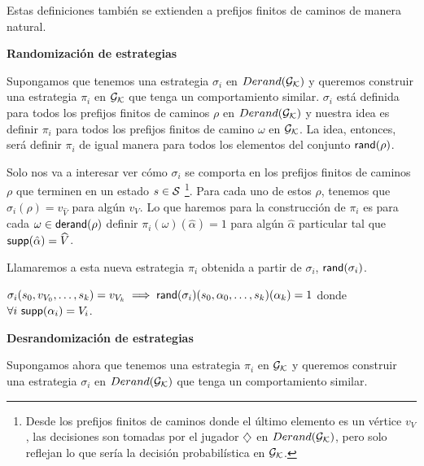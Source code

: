 Estas definiciones también se extienden a prefijos finitos de caminos de manera
natural.

\textbf{Randomización de estrategias}

Supongamos que tenemos una estrategia $\sigma_i$ en $Derand(\mathcal{G}_{\mathcal{K}})$ y queremos construir
una estrategia $\pi_i$ en $\mathcal{G}_{\mathcal{K}}$ que tenga un comportamiento similar. $\sigma_i$
está definida para todos los prefijos finitos de caminos $\rho$ en $Derand(\mathcal{G}_{\mathcal{K}})$ y
nuestra idea es definir $\pi_i$ para todos los prefijos finitos de camino
$\omega$ en $\mathcal{G}_{\mathcal{K}}$. La idea, entonces, será definir $\pi_i$ de igual manera para
todos los elementos del conjunto $\textsf{rand}(\rho)$.

Solo nos va a interesar ver cómo $\sigma_i$ se comporta en los prefijos finitos
de caminos $\rho$ que terminen en un estado $s \in \mathcal{S}$ \footnote{Desde los
	prefijos finitos de caminos donde el último elemento es un vértice $v_V$, las
	decisiones son tomadas por el jugador $\diamondsuit$ en $Derand(\mathcal{G}_{\mathcal{K}})$, pero solo reflejan lo
	que sería la decisión probabilística en $\mathcal{G}_{\mathcal{K}}$.}. Para cada uno de estos $\rho$,
tenemos que $\sigma_i(\rho) = v_{\widehat{V}}$ para algún $v_V$. Lo que haremos
para la construcción de $\pi_i$ es para cada $\omega \in \textsf{derand}(\rho)$ definir
$\pi_i(\omega)(\hat\alpha) = 1$ para algún $\hat\alpha$ particular tal que
$\textsf{supp}(\hat\alpha) = \widehat{V}$.

Llamaremos a esta nueva estrategia $\pi_i$ obtenida a partir de $\sigma_i$,
$\textsf{rand}(\sigma_i)$.

\begin{center}
	$\sigma_i(s_0, v_{V_0}, \dots, s_k) = v_{V_k} \implies \textsf{rand}(\sigma_i)(s_0, \alpha_0, \dots, s_k)(\alpha_k) = 1$ donde \\ $\forall i \ \textsf{supp}(\alpha_i) = V_i$.
\end{center}

\textbf{Desrandomización de estrategias}

Supongamos ahora que tenemos una estrategia $\pi_i$ en $\mathcal{G}_{\mathcal{K}}$ y queremos
construir una estrategia $\sigma_i$ en $Derand(\mathcal{G}_{\mathcal{K}})$ que tenga un comportamiento
similar.

